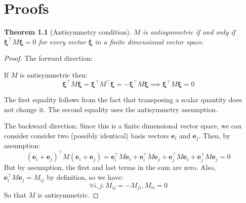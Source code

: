 \documentclass[12pt,a4paper,twoside]{report}
\newtheorem{thm}{Theorem}[section]
\theoremstyle{definition}
\begin{document}
\chapter{Proofs}
\begin{thm}[Antisymmetry condition]\label{antisymmetry}
	$M$ is antisymmetric if and only if $\boldsymbol \xi^\top M\boldsymbol \xi=0$ for every vector $\boldsymbol \xi$ in a finite dimensional vector space.
\end{thm}
\begin{proof}
	The forward direction:
	
	If $M$ is antisymmetric then:
	$$\boldsymbol \xi^\top M \boldsymbol \xi = \boldsymbol \xi^\top M^\top \boldsymbol \xi = -\boldsymbol \xi^\top M\boldsymbol \xi\implies \boldsymbol \xi^\top M \boldsymbol \xi=0$$

	The first equality follows from the fact that transposing a scalar quantity does not change it. The second equality uses the antisymmetry assumption.

	The backward direction:
	Since this is a finite dimensional vector space, we can consider consider two (possibly identical) basis vectors $\mathbf e_i$ and $\mathbf e_j$. Then, by assumption:
	$$(\mathbf e_i+\mathbf e_j)^\top M (\mathbf e_i + \mathbf e_j) = \mathbf e_i^\top M \mathbf e_i + \mathbf e_i^\top M \mathbf e_j + \mathbf e_j^\top M \mathbf e_i +\mathbf e_j^\top M \mathbf e_j=0$$
	But by assumption, the first and last terms in the sum are zero. Also, $\mathbf e_i^\top M \mathbf e_j=M_{ij}$ by definition, so we have:
	$$\forall i,j:M_{ij}=-M_{ji}, M_{ii}=0$$
	So that $M$ is antisymmetric.
\end{proof}

\label{lastpage}
\end{document}

